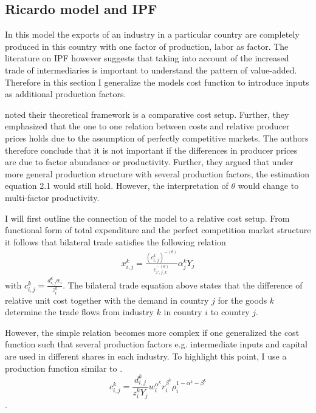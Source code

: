 \subsection{Ricardo model and IPF}
In this model the exports of an industry in a particular country are completely produced in this country with one factor of production, labor as factor.
 The literature on IPF however suggests that taking into account of the increased trade of intermediaries is important to understand the pattern of value-added.
  Therefore in this section I generalize the models cost function to introduce inputs as additional production factors. \par
\textcite{costinot} noted their theoretical framework is a comparative cost setup.
Further, they emphasized that the one to one relation between costs and relative producer prices holds due to the assumption of perfectly competitive markets.
 The authors therefore conclude that it is not important if the differences in producer prices are due to factor abundance or productivity.
 Further, they argued that under more general production structure with several production factors, the estimation equation 2.1 would still hold.
 However, the interpretation of $\theta$ would change to multi-factor productivity. \par  I will first outline the connection of the model to a relative cost setup.
From  functional form of total expenditure and the perfect competition market structure it follows that bilateral trade satisfies the following relation \begin{align}
 x^k_{i,j}= \frac{(c^k_{i,j})^{ -(\theta) } } { c_{i',j,k}^{-(\theta) } }  \alpha^k_j Y_j
\end{align} with $c^k_{i,j}=\frac{d^k_{i,j} w_i}{z_i^k}$.
 The bilateral trade equation above states that the difference of relative unit cost together with the demand in country $j$ for the goods $k$ determine the trade flows from industry $k$ in country $i$ to country $j$.
 \par
 However, the simple relation becomes more complex if one generalized the cost function such that several production factors e.g. intermediate inputs and capital are used in different shares in each industry.
 To highlight this point, I use a production function similar to \textcite{Shikher}.
  \[ c^k_{i,j}=\frac{d^k_{i,j}}{z_{i}^k Y_j} w^{\alpha^k}_i r^{\beta^k}_i \rho^{1-\alpha^k-\beta^k}_{i} \].
